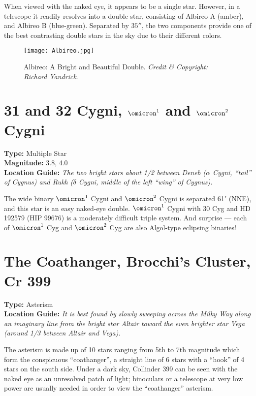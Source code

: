 When viewed with the naked eye, it appears to be a single
star. However, in a telescope it readily resolves into a double star,
consisting of Albireo A (amber), and Albireo B (blue-green). Separated
by $35''$, the two components provide one of the best contrasting
double stars in the sky due to their different colors.

\begin{figure}[ht]
\texttt{[image: Albireo.jpg]}
\caption{Albireo: A Bright and Beautiful Double. \emph{Credit \& Copyright: Richard Yandrick}.}
\label{fig:Albireo}
\end{figure}

\section{31 and 32 Cygni, \texorpdfstring{$\omicron^1$ and $\omicron^2$}{omicron1 and omicron2} Cygni}
\textbf{Type:} Multiple Star \\
\textbf{Magnitude:} 3.8, 4.0 \\
\textbf{Location Guide:} \textit{The two bright stars about 1/2
  between Deneb ($\alpha$ Cygni, ``tail'' of Cygnus) and Rukh
  ($\delta$ Cygni, middle of the left ``wing'' of Cygnus).}

The wide binary $\omicron^1$ Cygni and $\omicron^2$ Cygni is separated
61$'$ (NNE), and this star is an easy naked-eye double. $\omicron^1$
Cygni with 30 Cyg and HD 192579 (HIP 99676) is a moderately difficult
triple system. And surprise --- each of $\omicron^1$ Cyg and
$\omicron^2$ Cyg are also Algol-type eclipsing binaries!

\section{The Coathanger, Brocchi's Cluster, Cr 399}
\textbf{Type:} Asterism \\
\textbf{Location Guide:} \textit{It is best found by slowly sweeping
  across the Milky Way along an imaginary line from the bright star
  Altair toward the even brighter star Vega (around 1/3 between Altair
  and Vega).}

The asterism is made up of 10 stars ranging from 5th to 7th magnitude
which form the conspicuous ``coathanger'', a straight line of 6 stars
with a ``hook'' of 4 stars on the south side. Under a dark sky,
Collinder 399 can be seen with the naked eye as an unresolved patch of
light; binoculars or a telescope at very low power are usually needed
in order to view the ``coathanger'' asterism.

